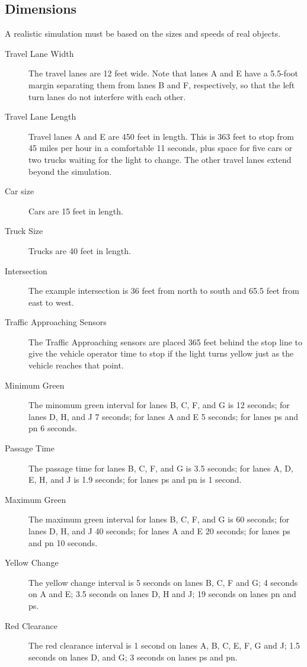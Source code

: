 \documentclass[letterpaper,twoside]{article}
\begin{document}
\subsection{Dimensions}

A realistic simulation must be based on the sizes and speeds of real objects.

\begin{description}
\item[Travel Lane Width]{The travel lanes are 12 feet wide.  Note that lanes
  A and E have a 5.5-foot margin separating them from lanes B and F,
  respectively, so that the left turn lanes do not interfere with each other.}
\item[Travel Lane Length]{Travel lanes A and E are 450 feet in length.
  This is 363 feet to stop from 45 miles per hour in a comfortable 11 seconds,
  plus space for five cars or two trucks waiting for the light to change.
  The other travel lanes extend beyond the simulation.}
\item[Car size]{Cars are 15 feet in length.}
\item[Truck Size]{Trucks are 40 feet in length.}
\item[Intersection]{The example intersection is 36 feet from north to south
  and 65.5 feet from east to west.}
\item[Traffic Approaching Sensors]{The Traffic Approaching sensors are placed
  365 feet behind the stop line to give the vehicle operator time to stop
  if the light turns yellow just as the vehicle reaches that point.}
\item[Minimum Green]{The minomum green interval for lanes B, C, F, and G
  is 12 seconds; for lanes D, H, and J 7 seconds; for lanes A and E 5 seconds;
  for lanes ps and pn 6 seconds.}
\item[Passage Time]{The passage time for lanes B, C, F, and G is 3.5
  seconds; for lanes A, D, E, H, and J is 1.9 seconds;
  for lanes ps and pn is 1 second.}
\item[Maximum Green]{The maximum green interval for lanes B, C, F, and G
  is 60 seconds; for lanes D, H, and J 40 seconds; for lanes A and E
  20 seconds; for lanes ps and pn 10 seconds.}
\item[Yellow Change]{The yellow change interval is 5 seconds on lanes
  B, C, F and G; 4 seconds on A and E; 3.5 seconds on lanes D, H and J;
  19 seconds on lanes pn and ps.}
\item[Red Clearance]{The red clearance interval is 1 second on lanes A, B, C,
  E, F, G and J; 1.5 seconds on lanes D, and G; 3 seconds on lanes ps and pn.}
\end{description}
\end{document}
